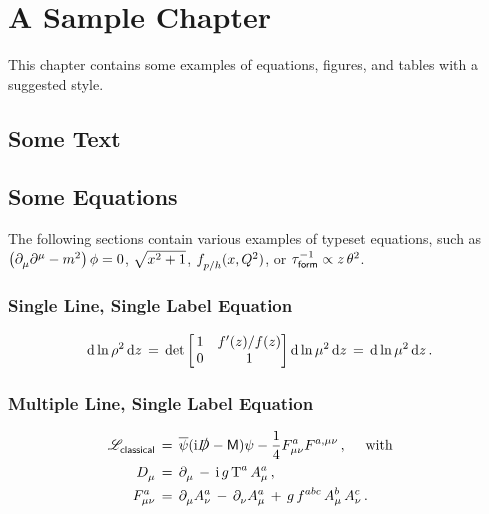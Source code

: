 \chapter{A Sample Chapter}
\label{chapter:SampleChapter}

This chapter contains some examples of equations, figures, and tables with a suggested style.

\section{Some Text}

\lipsum[3]

\section{Some Equations}

The following sections contain various examples of typeset equations, such as $\left(\partial_{\mu}^{}\partial_{}^{\mu} - m_{}^{2}\right) \phi = 0$, $\sqrt{x_{}^{2} + 1}$, $f_{p/h}^{}(x, Q_{}^{2})$, or $\tau^{-1}_{\sf form} \propto z \,\theta_{}^{2}$. 


\subsection{Single Line, Single Label Equation}

\begin{align}
	{\rm d} \ln \rho_{}^{2} \, {\rm d} z
	\,=\,
	{\rm det}
	\begin{bmatrix}
		\,1 & f'(z) / f(z) \\
		\,0 & 1
	\end{bmatrix} 
	{\rm d} \ln \mu_{}^{2} \, {\rm d} z
	\,=\,
	{\rm d} \ln \mu_{}^{2} \, {\rm d} z
	\,.
\end{align}

\subsection{Multiple Line, Single Label Equation}

\begin{align} \begin{split}
	\mathscr{L}_{\textsf{classical}}^{} \,&=\, 
	\overline{\psi} ( {\rm i} \slashed{D} - {\sf M} ) \psi - \frac{1}{4} F^{a}_{\mu\nu} F^{a,\mu\nu}_{} \,,
	\quad\textrm{ with }\quad\\
	D_{\mu}^{} \,&=\, \partial_{\mu}^{} \,-\, {\rm i}\,g\, \textrm{T}_{}^{a} \, A^{a}_{\mu} \,,\\
	F^{a}_{\mu\nu} \,&=\, \partial_{\mu}^{} A^{a}_{\nu} \,-\, \partial_{\nu}^{} A^{a}_{\mu}
	\,+\, g\, f_{}^{abc}\,A^{b}_{\mu}\,A^{c}_{\nu}\,.
\end{split} \end{align}

